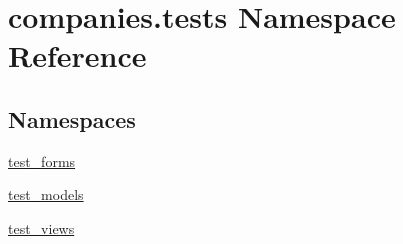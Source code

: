 \hypertarget{namespacecompanies_1_1tests}{\section{companies.\-tests Namespace Reference}
\label{namespacecompanies_1_1tests}
}
\subsection*{Namespaces}
\begin{DoxyCompactItemize}
\item 
\hyperlink{namespacecompanies_1_1tests_1_1test__forms}{test\-\_\-forms}
\item 
\hyperlink{namespacecompanies_1_1tests_1_1test__models}{test\-\_\-models}
\item 
\hyperlink{namespacecompanies_1_1tests_1_1test__views}{test\-\_\-views}
\end{DoxyCompactItemize}
